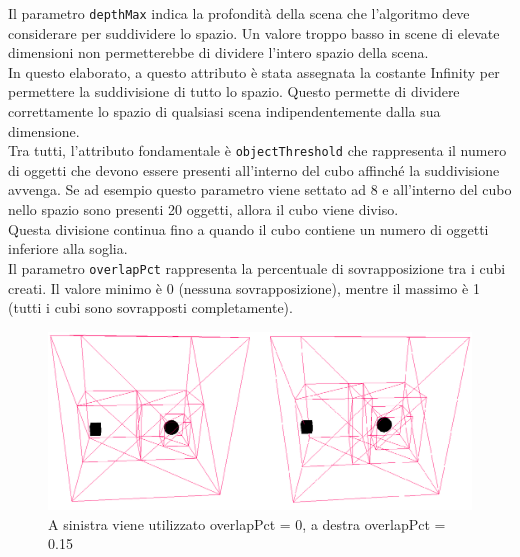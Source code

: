 Il parametro \texttt{depthMax} indica la profondità della scena che l’algoritmo deve considerare per suddividere lo spazio. Un valore troppo basso in scene di elevate dimensioni non permetterebbe di dividere l’intero spazio della scena.
\\
In questo elaborato, a questo attributo è stata assegnata la costante Infinity per permettere la suddivisione di tutto lo spazio. Questo permette di dividere correttamente lo spazio di qualsiasi scena indipendentemente dalla sua dimensione.
\\

Tra tutti, l’attributo fondamentale è \texttt{objectThreshold} che rappresenta il numero di oggetti che devono essere presenti all’interno del cubo affinché la suddivisione avvenga.
Se ad esempio questo parametro viene settato ad 8 e all’interno del cubo nello spazio sono presenti 20 oggetti, allora il cubo viene diviso.
\\
Questa divisione continua fino a quando il cubo contiene un numero di oggetti inferiore alla soglia.
\\

Il parametro \texttt{overlapPct} rappresenta la percentuale di sovrapposizione tra i cubi creati. Il valore minimo è 0 (nessuna sovrapposizione), mentre il massimo è 1 (tutti i cubi sono sovrapposti completamente).

\begin{figure}[htb]
 \centering
 \includegraphics[width=1\linewidth]{images/chapter_navigazione_scena/boxoverlap.png}\hfill
 \caption[Octree overlapPct.]{A sinistra viene utilizzato overlapPct = 0, a destra overlapPct = 0.15}
 \label{fig:navigazione_scena_collision_boxradius}
\end{figure}



